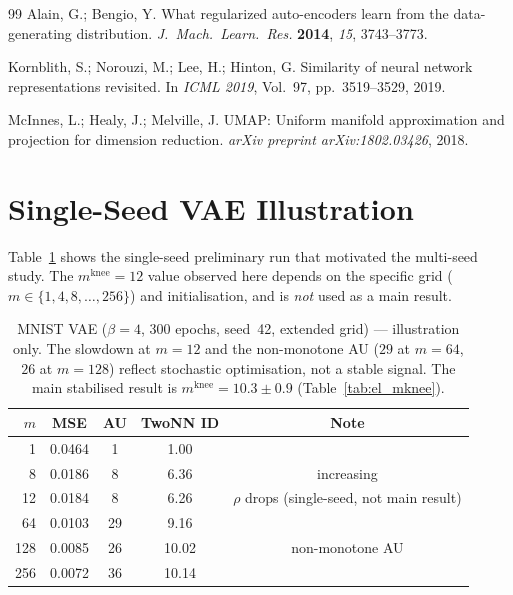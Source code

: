 \documentclass[11pt,a4paper]{article}
\newcommand{\mknee}{m^{\mathrm{knee}}}
\begin{document}
\begin{thebibliography}{99}
Alain, G.; Bengio, Y.
What regularized auto-encoders learn from the data-generating distribution.
\textit{J.~Mach.~Learn.~Res.} \textbf{2014}, \textit{15}, 3743--3773.

Kornblith, S.; Norouzi, M.; Lee, H.; Hinton, G.
Similarity of neural network representations revisited.
In \textit{ICML 2019}, Vol.~97, pp.~3519--3529, 2019.

McInnes, L.; Healy, J.; Melville, J.
UMAP: Uniform manifold approximation and projection for dimension reduction.
\textit{arXiv preprint arXiv:1802.03426}, 2018.

\end{thebibliography}

\appendix

\section{Single-Seed VAE Illustration}\label{app:vae_single_seed}

Table~\ref{tab:e4_vae} shows the single-seed preliminary run that motivated
the multi-seed study.
The $\mknee=12$ value observed here depends on the specific grid
($m\in\{1,4,8,\ldots,256\}$) and initialisation, and is \emph{not} used as a
main result.

\begin{table}[H]
\centering
\caption{MNIST VAE ($\beta=4$, 300 epochs, seed~42, extended grid) — illustration only.
The slowdown at $m=12$ and the non-monotone AU ($29$ at $m=64$, $26$ at $m=128$)
reflect stochastic optimisation, not a stable signal.
The main stabilised result is $\mknee=10.3\pm0.9$ (Table~\ref{tab:el_mknee}).}
\label{tab:e4_vae}
\small
\begin{tabular}{rcccc}
\toprule
$m$ & MSE & AU & TwoNN ID & Note \\
\midrule
1   & 0.0464 & 1  & 1.00  & \\
8   & 0.0186 & 8  & 6.36  & increasing \\
12  & 0.0184 & 8  & 6.26  & $\rho$ drops (single-seed, not main result) \\
64  & 0.0103 & 29 & 9.16  & \\
128 & 0.0085 & 26 & 10.02 & non-monotone AU \\
256 & 0.0072 & 36 & 10.14 & \\
\bottomrule
\end{tabular}
\end{table}
\end{document}
